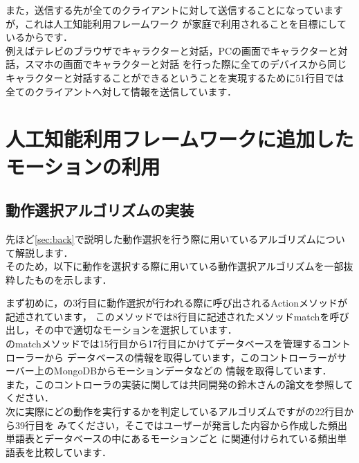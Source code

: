 また，送信する先が全てのクライアントに対して送信することになっていますが，これは人工知能利用フレームワーク
が家庭で利用されることを目標にしているからです．\\

例えばテレビのブラウザでキャラクターと対話，PCの画面でキャラクターと対話，スマホの画面でキャラクターと対話
を行った際に全てのデバイスから同じキャラクターと対話することができるということを実現するために51行目では
全てのクライアントへ対して情報を送信しています．\\


\section{人工知能利用フレームワークに追加したモーションの利用}\label{sec:motion}
\subsection{動作選択アルゴリズムの実装}
先ほど\ref{sec:back}で説明した動作選択を行う際に用いているアルゴリズムについて解説します．\\

そのため，以下に動作を選択する際に用いている動作選択アルゴリズムを一部抜粋したものを示します．


まず初めに，の3行目に動作選択が行われる際に呼び出されるActionメソッドが記述されています，
このメソッドでは8行目に記述されたメソッドmatchを呼び出し，その中で適切なモーションを選択しています．\\

のmatchメソッドでは15行目から17行目にかけてデータベースを管理するコントローラーから
データベースの情報を取得しています，このコントローラーがサーバー上のMongoDBからモーションデータなどの
情報を取得しています．\\
また，このコントローラの実装に関しては共同開発の鈴木さんの論文を参照してください．\\

次に実際にどの動作を実行するかを判定しているアルゴリズムですがの22行目から39行目を
みてください，そこではユーザーが発言した内容から作成した頻出単語表とデータベースの中にあるモーションごと
に関連付けられている頻出単語表を比較しています．\\

